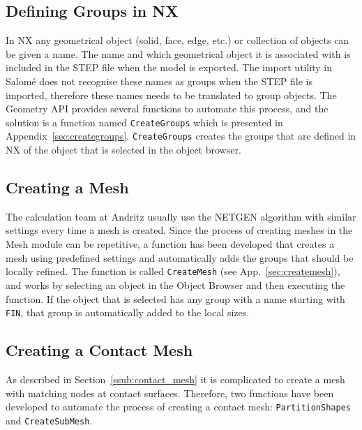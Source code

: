 \subsection{Defining Groups in NX} %
\label{sub:defining_groups_in_nx}
In NX any geometrical object (solid, face, edge, etc.) or collection of objects can be given a name. The name and which geometrical object it is associated with is included in the STEP file when the model is exported. The import utility in Salomé does not recognise these names as groups when the STEP file is imported, therefore these names needs to be translated to group objects. The Geometry API provides several functions to automate this process, and the solution is a function named \texttt{CreateGroups} which is presented in Appendix~\ref{sec:creategroups}. \texttt{CreateGroups} creates the groups that are defined in NX of the object that is selected in the object browser.


\subsection{Creating a Mesh} %
\label{sub:creating_a_mesh}
The calculation team at Andritz usually use the NETGEN algorithm with similar settings every time a mesh is created. Since the process of creating meshes in the Mesh module can be repetitive, a function has been developed that creates a mesh using predefined settings and automatically adds the groups that should be locally refined. The function is called \texttt{CreateMesh} (see App.~\ref{sec:createmesh}), and works by selecting an object in the Object Browser and then executing the function. If the object that is selected has any group with a name starting with \texttt{FIN}, that group is automatically added to the local sizes.

\subsection{Creating a Contact Mesh} %
\label{sub:creating_a_contact_mesh}
As described in Section~\ref{ssub:contact_mesh} it is complicated to create a mesh with matching nodes at contact surfaces. Therefore, two functions have been developed to automate the process of creating a contact mesh: \texttt{PartitionShapes} and \texttt{CreateSubMesh}.


